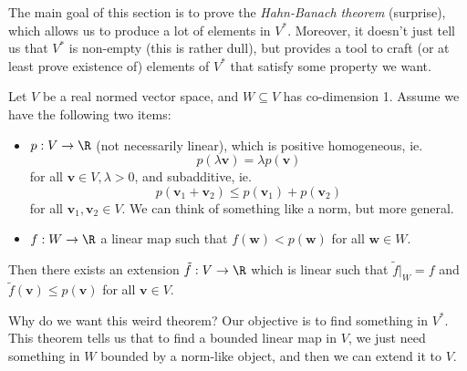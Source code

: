 \documentclass[a4paper]{article}
\begin{document}
The main goal of this section is to prove the \emph{Hahn-Banach theorem} (surprise), which allows us to produce a lot of elements in $V^*$. Moreover, it doesn't just tell us that $V^*$ is non-empty (this is rather dull), but provides a tool to craft (or at least prove existence of) elements of $V^*$ that satisfy some property we want.

\begin{prop}
  Let $V$ be a real normed vector space, and $W\subseteq V$ has co-dimension 1. Assume we have the following two items:
  \begin{itemize}
    \item $p: V \to \R$ (not necessarily linear), which is positive homogeneous, ie.
      \[
        p (\lambda \mathbf{v}) = \lambda p(\mathbf{v})
      \]
      for all $\mathbf{v}\in V, \lambda > 0$, and subadditive, ie.
      \[
        p(\mathbf{v}_1 + \mathbf{v}_2) \leq p (\mathbf{v}_1) + p(\mathbf{v}_2)
      \]
      for all $\mathbf{v}_1, \mathbf{v}_2 \in V$. We can think of something like a norm, but more general.
    \item $f: W \to \R$ a linear map such that $f(\mathbf{w}) < p (\mathbf{w})$ for all $\mathbf{w}\in W$.
  \end{itemize}
  Then there exists an extension $\tilde{f}: V\to \R$ which is linear such that $\tilde{f}|_{W} = f$ and $\tilde{f}(\mathbf{v}) \leq p(\mathbf{v})$ for all $\mathbf{v}\in V$.
\end{prop}
Why do we want this weird theorem? Our objective is to find something in $V^*$. This theorem tells us that to find a bounded linear map in $V$, we just need something in $W$ bounded by a norm-like object, and then we can extend it to $V$.
\end{document}
